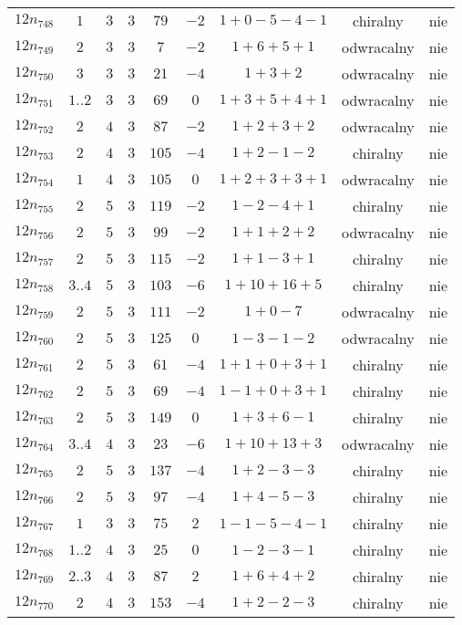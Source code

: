 \begin{longtable}{ccccccccc}
$12n_{748}$ & $1$ & $3$ & $3$ & $79$ & $-2$ & $1+0-5-4-1$ & chiralny & nie \\
$12n_{749}$ & $2$ & $3$ & $3$ & $7$ & $-2$ & $1+6+5+1$ & odwracalny & nie \\
$12n_{750}$ & $3$ & $3$ & $3$ & $21$ & $-4$ & $1+3+2$ & odwracalny & nie \\
$12n_{751}$ & $1..2$ & $3$ & $3$ & $69$ & $0$ & $1+3+5+4+1$ & odwracalny & nie \\
$12n_{752}$ & $2$ & $4$ & $3$ & $87$ & $-2$ & $1+2+3+2$ & odwracalny & nie \\
$12n_{753}$ & $2$ & $4$ & $3$ & $105$ & $-4$ & $1+2-1-2$ & chiralny & nie \\
$12n_{754}$ & $1$ & $4$ & $3$ & $105$ & $0$ & $1+2+3+3+1$ & odwracalny & nie \\
$12n_{755}$ & $2$ & $5$ & $3$ & $119$ & $-2$ & $1-2-4+1$ & chiralny & nie \\
$12n_{756}$ & $2$ & $5$ & $3$ & $99$ & $-2$ & $1+1+2+2$ & odwracalny & nie \\
$12n_{757}$ & $2$ & $5$ & $3$ & $115$ & $-2$ & $1+1-3+1$ & chiralny & nie \\
$12n_{758}$ & $3..4$ & $5$ & $3$ & $103$ & $-6$ & $1+10+16+5$ & chiralny & nie \\
$12n_{759}$ & $2$ & $5$ & $3$ & $111$ & $-2$ & $1+0-7$ & odwracalny & nie \\
$12n_{760}$ & $2$ & $5$ & $3$ & $125$ & $0$ & $1-3-1-2$ & odwracalny & nie \\
$12n_{761}$ & $2$ & $5$ & $3$ & $61$ & $-4$ & $1+1+0+3+1$ & chiralny & nie \\
$12n_{762}$ & $2$ & $5$ & $3$ & $69$ & $-4$ & $1-1+0+3+1$ & chiralny & nie \\
$12n_{763}$ & $2$ & $5$ & $3$ & $149$ & $0$ & $1+3+6-1$ & chiralny & nie \\
$12n_{764}$ & $3..4$ & $4$ & $3$ & $23$ & $-6$ & $1+10+13+3$ & odwracalny & nie \\
$12n_{765}$ & $2$ & $5$ & $3$ & $137$ & $-4$ & $1+2-3-3$ & chiralny & nie \\
$12n_{766}$ & $2$ & $5$ & $3$ & $97$ & $-4$ & $1+4-5-3$ & chiralny & nie \\
$12n_{767}$ & $1$ & $3$ & $3$ & $75$ & $2$ & $1-1-5-4-1$ & chiralny & nie \\
$12n_{768}$ & $1..2$ & $4$ & $3$ & $25$ & $0$ & $1-2-3-1$ & chiralny & nie \\
$12n_{769}$ & $2..3$ & $4$ & $3$ & $87$ & $2$ & $1+6+4+2$ & chiralny & nie \\
$12n_{770}$ & $2$ & $4$ & $3$ & $153$ & $-4$ & $1+2-2-3$ & chiralny & nie \\

\end{longtable}
